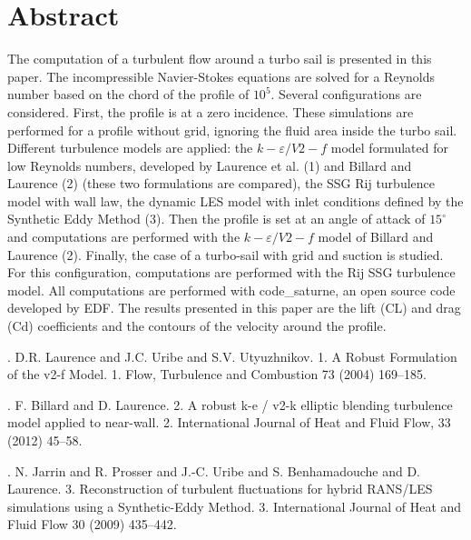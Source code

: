 \documentclass[article, A4, 11pt]{llncs}%
\begin{document}
\section*{Abstract}
The computation of a turbulent flow around a turbo sail is presented in this paper.  The incompressible Navier-Stokes equations are solved for a Reynolds number based on the chord of the profile of $10^5$. Several configurations are considered. First, the profile is at a zero incidence. These simulations are performed for a profile without grid, ignoring the fluid area inside the turbo sail. Different turbulence models are applied: the $k-\varepsilon/V2-f$ model formulated for low Reynolds numbers, developed by Laurence et al. (1) and Billard and Laurence (2) (these two formulations are compared), the SSG Rij turbulence model with wall law, the dynamic LES model with inlet conditions defined by the Synthetic Eddy Method (3). Then the profile is set at an angle of attack of $15^\circ$ and computations are performed with the $k-\varepsilon/V2-f$ model of Billard and Laurence (2). Finally, the case of a turbo-sail with grid and suction is studied. For this configuration, computations are performed with the Rij SSG turbulence model. All computations are performed with code\_saturne, an open source code developed by EDF. The results presented in this paper are the lift (CL) and drag (Cd) coefficients and the contours of the velocity around the profile. 


\begin{thebibliography}{10}
{. D.R. Laurence and J.C. Uribe and S.V. Utyuzhnikov}. {1. A Robust Formulation of the v2-f Model}. 1. Flow, Turbulence and Combustion 73 (2004) 169–185.

{. F. Billard and D. Laurence}. {2. A robust k-e / v2-k elliptic blending turbulence model applied to near-wall}. 2. International Journal of Heat and Fluid Flow, 33 (2012) 45–58.

{. N. Jarrin and R. Prosser and J.-C. Uribe and S. Benhamadouche and D. Laurence}. {3. Reconstruction of turbulent fluctuations for hybrid RANS/LES simulations using a Synthetic-Eddy Method}. 3.  International Journal of Heat and Fluid Flow 30 (2009) 435–442.
\end{thebibliography} %
\end{document}
